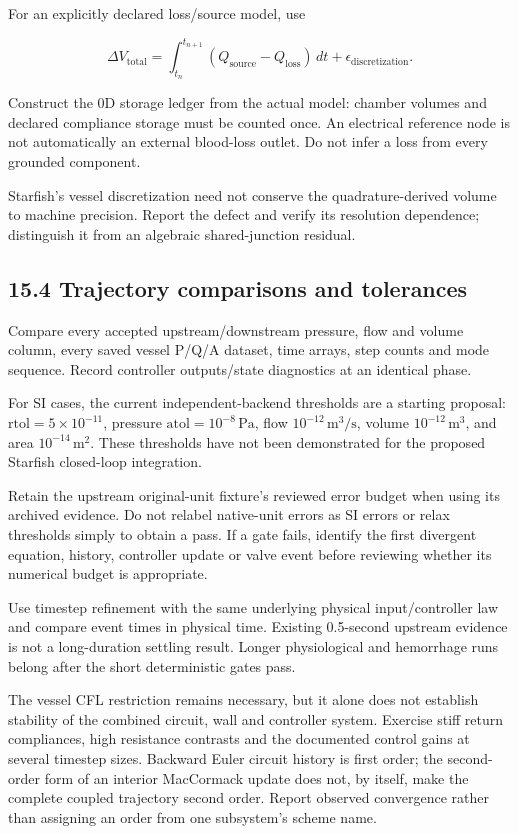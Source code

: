 \documentclass[11pt,a4paper]{article}
\begin{document}
For an explicitly declared loss/source model, use


\nopagebreak[3]
\[
\Delta V_{\mathrm{total}}
=\int_{t_n}^{t_{n+1}}(Q_{\mathrm{source}}-Q_{\mathrm{loss}})\,dt
+\epsilon_{\mathrm{discretization}}.
\]


Construct the 0D storage ledger from the actual model: chamber volumes and declared compliance storage must be counted once. An electrical reference node is not automatically an external blood-loss outlet. Do not infer a loss from every grounded component.

Starfish's vessel discretization need not conserve the quadrature-derived volume to machine precision. Report the defect and verify its resolution dependence; distinguish it from an algebraic shared-junction residual.

\subsection{15.4 Trajectory comparisons and tolerances}
Compare every accepted upstream/downstream pressure, flow and volume column, every saved vessel P/Q/A dataset, time arrays, step counts and mode sequence. Record controller outputs/state diagnostics at an identical phase.

For SI cases, the current independent-backend thresholds are a starting proposal: \(\mathrm{rtol}=5\times10^{-11}\), pressure \(\mathrm{atol}=10^{-8}\,\mathrm{Pa}\), flow \(10^{-12}\,\mathrm{m}^3/\mathrm{s}\), volume \(10^{-12}\,\mathrm{m}^3\), and area \(10^{-14}\,\mathrm{m}^2\). These thresholds have not been demonstrated for the proposed Starfish closed-loop integration.

Retain the upstream original-unit fixture's reviewed error budget when using its archived evidence. Do not relabel native-unit errors as SI errors or relax thresholds simply to obtain a pass. If a gate fails, identify the first divergent equation, history, controller update or valve event before reviewing whether its numerical budget is appropriate.

Use timestep refinement with the same underlying physical input/controller law and compare event times in physical time. Existing 0.5-second upstream evidence is not a long-duration settling result. Longer physiological and hemorrhage runs belong after the short deterministic gates pass.

The vessel CFL restriction remains necessary, but it alone does not establish stability of the combined circuit, wall and controller system. Exercise stiff return compliances, high resistance contrasts and the documented control gains at several timestep sizes. Backward Euler circuit history is first order; the second-order form of an interior MacCormack update does not, by itself, make the complete coupled trajectory second order. Report observed convergence rather than assigning an order from one subsystem's scheme name.
\end{document}
